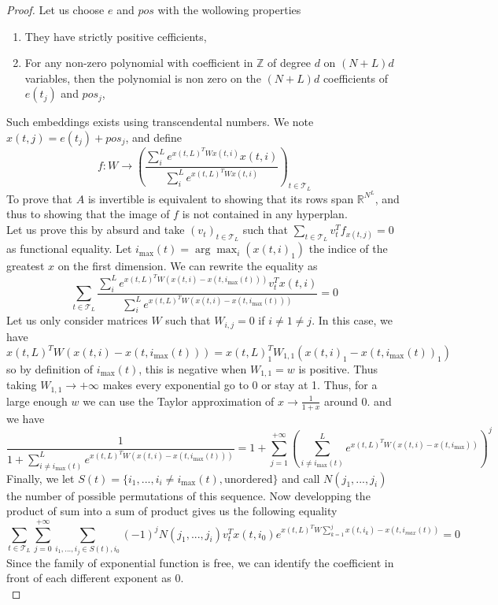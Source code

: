 \documentclass{article}
\begin{document}
\begin{proof}
    Let us choose $e$ and $pos$ with the wollowing properties
    \begin{enumerate}
        \item They have strictly positive cefficients,
        \item For any non-zero polynomial with coefficient in $\mathbb{Z}$ of degree $d$ on $(N+L)d$ variables, then the polynomial is non zero
        on the $(N+L)d$ coefficients of $e(t_j)$ and $pos_j$,
    \end{enumerate}
    Such embeddings exists using transcendental numbers.
    We note $x(t, j) = e(t_j)+pos_j$, and define 
    \[f:W \rightarrow \left(\frac{\sum_{i}^Le^{x(t,L)^TWx(t,i)}x(t,i)}{\sum_{i}^Le^{x(t,L)^TWx(t,i)}}\right)_{t\in\mathcal{T}_L}\]
    To prove that $A$ is invertible is equivalent to showing that its rows span $\mathbb{R}^{N^L}$, and thus to showing that the image 
    of $f$ is not contained in any hyperplan.
    \\ 

    Let us prove this by absurd and take $(v_t)_{t\in\mathcal{T}_L}$ such that $\sum_{t\in\mathcal{T}_L}v_t^Tf_{x(t,j)} = 0$ 
    as functional equality. Let $i_{\max}(t) = \arg\max_i(x(t,i)_1)$ the indice of the greatest $x$ on the first dimension.
    We can rewrite the equality as 
    \[\sum_{t\in\mathcal{T}_L}\frac{\sum_{i}^Le^{x(t,L)^TW(x(t,i)-x(t,i_{\max}(t)))}v_t^Tx(t,i)}{\sum_{i}^Le^{x(t,L)^TW(x(t,i)-x(t,i_{\max}(t)))}} = 0\]
    Let us only consider matrices $W$ such that $W_{i,j} = 0$ if $i\neq 1\neq j$. In this case, we have 
    $x(t,L)^TW(x(t,i)-x(t,i_{\max}(t))) = x(t,L)_1^TW_{1,1}(x(t,i)_1-x(t,i_{\max}(t))_1)$ so by definition of $i_{\max}(t)$, this is negative 
    when $W_{1, 1} = w$ is positive. Thus taking $W_{1, 1} \rightarrow +\infty$ makes every exponential go to 0 or stay at 1. Thus,
    for a large enough $w$ we can use the Taylor approximation of $x\rightarrow \frac{1}{1+x}$ around 0. and we have 
    \[\frac{1}{1+\sum_{i\neq i_{\max}(t)}^Le^{x(t,L)^TW(x(t,i)-x(t,i_{\max}(t)))}} = 1+\sum_{j=1}^{+\infty}\left(\sum_{i\neq i_{\max}(t)}^Le^{x(t,L)^TW(x(t,i)-x(t,i_{\max}))}\right)^j\]
    Finally, we let $S(t) = \{i_1, ..., i_i \neq i_{\max}(t), \text{unordered}\}$ and call $N(j_1, ..., j_i)$ the number of 
    possible permutations of this sequence. Now developping the product of sum into a sum of product gives us the following equality
    \[\sum_{t\in\mathcal{T}_L}\sum_{j=0}^{+\infty}\sum_{i_1, ..., i_j \in S(t), i_0}(-1)^jN(j_1, ..., j_i)v_t^Tx(t, i_0)e^{x(t,L)^TW\sum_{k=1}^{j}x(t, i_k) - x(t, i_{max}(t))} = 0\]
    Since the family of exponential function is free, we can identify the coefficient in front of each different exponent as 0.
    \\


\end{proof}
\end{document}
